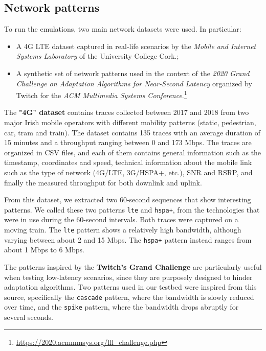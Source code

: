 \subsection{Network patterns}
\label{sec:testbed/network/patterns}

To run the emulations, two main network datasets were used. In particular:

\begin{itemize}
    \item A 4G LTE dataset captured in real-life scenarios by the \textit{Mobile and Internet Systems Laboratory} of the University College Cork.\cite{dataset1};
    \item A synthetic set of network patterns used in the context of the \textit{2020 Grand Challenge on Adaptation Algorithms for Near-Second Latency} organized by Twitch for the \textit{ACM Multimedia Systems Conference}.\footnote{\url{https://2020.acmmmsys.org/lll_challenge.php}}
\end{itemize}

The \textbf{"4G" dataset} contains traces collected between 2017 and 2018 from two major Irish mobile operators with different mobility patterns (static, pedestrian, car, tram and train). The dataset contains 135 traces with an average duration of 15 minutes and a throughput ranging between 0 and 173 Mbps. The traces are organized in CSV files, and each of them contains general information such as the timestamp, coordinates and speed, technical information about the mobile link such as the type of network (4G/LTE, 3G/HSPA+, etc.), SNR and RSRP, and finally the measured throughput for both downlink and uplink.

From this dataset, we extracted two 60-second sequences that show interesting patterns. We called these two patterns \texttt{lte} and \texttt{hspa+}, from the technologies that were in use during the 60-second intervals. Both traces were captured on a moving train. The \texttt{lte} pattern shows a relatively high bandwidth, although varying between about 2 and 15 Mbps. The \texttt{hspa+} pattern instead ranges from about 1 Mbps to 6 Mbps.

The patterns inspired by the \textbf{Twitch's Grand Challenge} are particularly useful when testing low-latency scenarios, since they are purposely designed to hinder adaptation algorithms. Two patterns used in our testbed were inspired from this source, specifically the \texttt{cascade} pattern, where the bandwidth is slowly reduced over time, and the \texttt{spike} pattern, where the bandwidth drops abruptly for several seconds.

